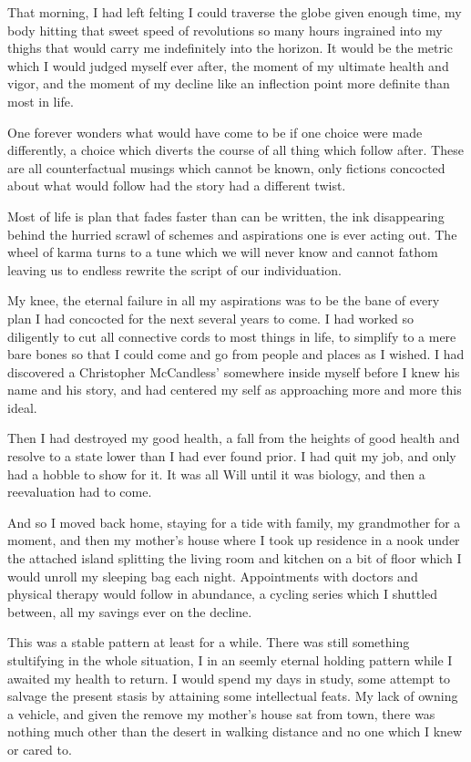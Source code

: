 \documentclass[ebook, 10pt, openright, onecolumn]{memoir}
\begin{document}
That morning, I had left felting I could traverse the globe given enough time,
my body hitting that sweet speed of revolutions so many hours ingrained into my
thighs that would carry me indefinitely into the horizon.  It would be the
metric which I would judged myself ever after, the moment of my ultimate health
and vigor, and the moment of my decline like an inflection point more definite
than most in life.

One forever wonders what would have come to be if one choice were made
differently, a choice which diverts the course of all thing which follow after.
These are all counterfactual musings which cannot be known, only fictions
concocted about what would follow had the story had a different twist.

Most of life is plan that fades faster than can be written, the ink
disappearing behind the hurried scrawl of schemes and aspirations one is ever
acting out.  The wheel of karma turns to a tune which we will never know and
cannot fathom leaving us to endless rewrite the script of our individuation.

My knee, the eternal failure in all my aspirations was to be the bane of every
plan I had concocted for the next several years to come.  I had worked so
diligently to cut all connective cords to most things in life, to simplify to a
mere bare bones so that I could come and go from people and places as I wished.
I had discovered a Christopher McCandless' somewhere inside myself before I knew
his name and his story, and had centered my self as approaching more and more
this ideal.  

Then I had destroyed my good health, a fall from the heights of good health and
resolve to a state lower than I had ever found prior.  I had quit my job, and
only had a hobble to show for it.  It was all Will until it was biology, and
then a reevaluation had to come.

And so I moved back home, staying for a tide with family, my grandmother for a
moment, and then my mother's house where I took up residence in a nook under the
attached island splitting the living room and kitchen on a bit of floor which I
would unroll my sleeping bag each night.  Appointments with doctors and physical
therapy would follow in abundance, a cycling series which I shuttled between,
all my savings ever on the decline.

This was a stable pattern at least for a while. There was still something
stultifying in the whole situation, I in an seemly eternal holding pattern while
I awaited my health to return.  I would spend my days in study, some attempt to
salvage the present stasis by attaining some intellectual feats.  My lack of
owning a vehicle, and given the remove my mother's house sat from town, there
was nothing much  other than the desert in walking distance and no one which I
knew or cared to.
\end{document}
